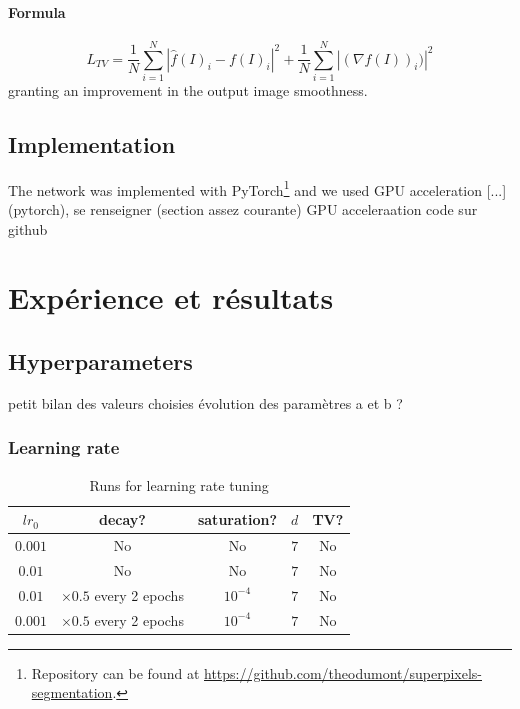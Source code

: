 \documentclass{article}
\begin{document}
            \paragraph{Formula}
            $$L_{TV}=\frac{1}{N}\sum_{i=1}^N |\hat{f}(I)_i-f(I)_i|^2+\frac{1}{N}\sum_{i=1}^N|(\nabla f(I))_i)|^2$$
            granting an improvement in the output image smoothness.

    \subsection{Implementation}
    The network was implemented with PyTorch\footnote{Repository can be found at \url{https://github.com/theodumont/superpixels-segmentation}.} and we used GPU acceleration [...]
    (pytorch), se renseigner (section assez courante)
    GPU acceleraation
    code sur github









\section{Expérience et résultats}
    \subsection{Hyperparameters}
    petit bilan des valeurs choisies
    évolution des paramètres a et b ?\\
        \subsubsection{Learning rate}
        \begin{table}[!ht]
            \center
            \begin{tabular}{|c|c|c|c|c|}
                \hline
                $lr_0$ & decay? & saturation? & $d$ & TV? \\
                \hline \hline
                $0.001$ & No & No & $7$ & No \\
                \hline
                $0.01$ & No & No & $7$ & No \\
                \hline
                $0.01$ & $\times 0.5$ every 2 epochs & $10^{-4}$ & $7$ & No \\
                \hline
                $0.001$ & $\times 0.5$ every 2 epochs & $10^{-4}$ & $7$ & No \\
                \hline
            \end{tabular}
        \caption{Runs for learning rate tuning}
        \end{table}
\end{document}
